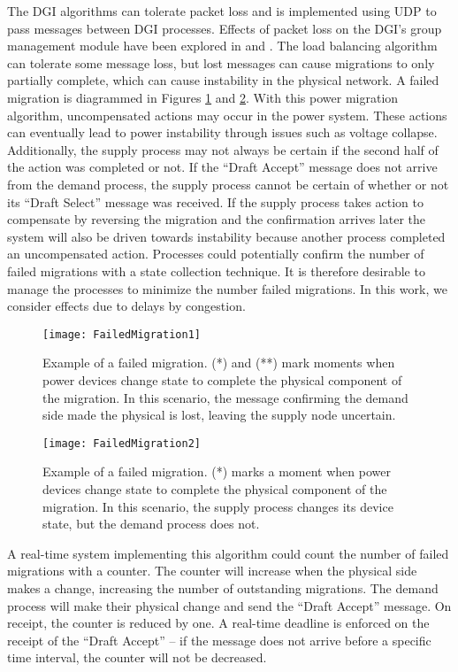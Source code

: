 The \ac{DGI} algorithms can tolerate packet loss and is implemented using UDP to pass messages between \ac{DGI} processes.
Effects of packet loss on the \ac{DGI}'s group management module have been explored in \cite{CRITIS2012} and \cite{JOURNAL}.
The load balancing algorithm can tolerate some message loss, but lost messages can cause migrations to only partially complete, which can cause instability in the physical network.
A failed migration is diagrammed in Figures \ref{fig:failed-migration-1} and \ref{fig:failed-migration-2}.
With this power migration algorithm, uncompensated actions may occur in the power system.
These actions can eventually lead to power instability through issues such as voltage collapse.
Additionally, the supply process may not always be certain if the second half of the action was completed or not.
If the ``Draft Accept'' message does not arrive from the demand process, the supply process cannot be certain of whether or not its ``Draft Select'' message was received.
If the supply process takes action to compensate by reversing the migration and the confirmation arrives later the system will also be driven towards instability because another process completed an uncompensated action.
Processes could potentially confirm the number of failed migrations with a state collection technique.
It is therefore desirable to manage the processes to minimize the number failed migrations.
In this work, we consider effects due to delays by congestion.

\begin{figure}
\centering
\texttt{[image: FailedMigration1]}
\caption{Example of a failed migration. (*) and (**) mark moments when power devices change state to complete the physical component of the migration. In this scenario, the message confirming the demand side made the physical is lost, leaving the supply node uncertain.}
\label{fig:failed-migration-1}
\end{figure}

\begin{figure}
\centering
\texttt{[image: FailedMigration2]}
\caption{Example of a failed migration. (*) marks a moment when power devices change state to complete the physical component of the migration. In this scenario, the supply process changes its device state, but the demand process does not.}
\label{fig:failed-migration-2}
\end{figure}

A real-time system implementing this algorithm could count the number of failed migrations with a counter.
The counter will increase when the physical side makes a change, increasing the number of outstanding migrations.
The demand process will make their physical change and send the ``Draft Accept'' message.
On receipt, the counter is reduced by one.
A real-time deadline is enforced on the receipt of the ``Draft Accept'' -- if the message does not arrive before a specific time interval, the counter will not be decreased.

